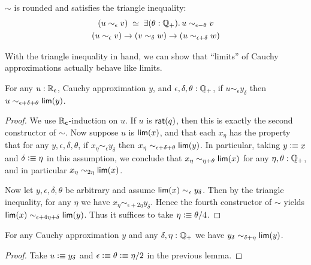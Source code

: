 \begin{cor}
  $\sim$ is rounded and satisfies the triangle inequality:
    \begin{gather}
      \eqvspaced{
        (u \sim_\epsilon v)
      }{
        \exis{\theta : \Qp} u \sim_{\epsilon - \theta} v
      }\\
      (u\sim_\epsilon v) \to (v\sim_\delta w) \to (u\sim_{\epsilon+\delta} w)\label{item:RC-sim-triangle}
    \end{gather}
\end{cor}

With the triangle inequality in hand, we can show that ``limits'' of Cauchy approximations actually behave like limits.

\begin{lem}\label{thm:RC-sim-lim}
  For any $u:\mathbb{R}_\mathsf{c}$, Cauchy approximation $y$, and $\epsilon,\delta,\theta:\mathbb{Q}_{+}$, if $u\sim_\epsilon y_\delta$ then $u\sim_{\epsilon+\delta+\theta} \mathsf{lim}(y)$.
\end{lem}
\begin{proof}
  We use $\mathbb{R}_\mathsf{c}$-induction on $u$.
  If $u$ is $\mathsf{rat}(q)$, then this is exactly the second constructor of $\sim$.
  Now suppose $u$ is $\mathsf{lim}(x)$, and that each $x_\eta$ has the property that for any $y,\epsilon,\delta,\theta$, if $x_\eta\sim_\epsilon y_\delta$ then $x_\eta \sim_{\epsilon+\delta+\theta} \mathsf{lim}(y)$.
  In particular, taking $y\vcentcolon\equiv x$ and $\delta\vcentcolon\equiv\eta$ in this assumption, we conclude that $x_\eta \sim_{\eta+\theta} \mathsf{lim}(x)$ for any $\eta,\theta:\mathbb{Q}_{+}$, and in particular $x_\eta \sim_{2\eta} \mathsf{lim}(x)$.

  Now let $y,\epsilon,\delta,\theta$ be arbitrary and assume $\mathsf{lim}(x) \sim_\epsilon y_\delta$.
  Then by the triangle inequality, for any $\eta$ we have $x_\eta \sim_{\epsilon+2\eta} y_\delta$.
  Hence the fourth constructor of $\sim$ yields $\mathsf{lim}(x) \sim_{\epsilon+4\eta+\delta} \mathsf{lim}(y)$.
  Thus it suffices to take $\eta \vcentcolon\equiv \theta/4$.
\end{proof}

\begin{lem}\label{thm:RC-sim-lim-term}
  For any Cauchy approximation $y$ and any $\delta,\eta:\mathbb{Q}_{+}$ we have $y_\delta \sim_{\delta+\eta} \mathsf{lim}(y)$.
\end{lem}
\begin{proof}
  Take $u\vcentcolon\equiv y_\delta$ and $\epsilon\vcentcolon\equiv\theta\vcentcolon\equiv \eta/2$ in the previous lemma.
\end{proof}

